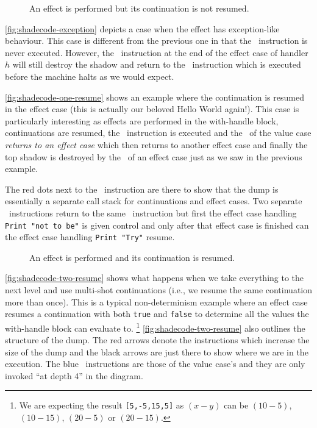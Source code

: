 \documentclass[class=article, crop=false]{standalone}
\begin{document}
\begin{figure}
    \centering
    \caption{An effect is performed but its continuation is not resumed.}
    \label{fig:shadecode-exception}
\end{figure}

\autoref{fig:shadecode-exception} depicts a case when the effect has
exception-like behaviour. This case is different from the previous one in that
the \vmKillShadow\ instruction is never executed. However, the \vmRett\
instruction at the end of the effect case of handler $h$ will still destroy the
shadow and return to the \vmFin\ instruction which is executed before the
machine halts as we would expect.

\autoref{fig:shadecode-one-resume} shows an example where the continuation is
resumed in the effect case (this is actually our beloved Hello World again!).
This case is particularly interesting as effects are performed in the
with-handle block, continuations are resumed, the \vmKillShadow\ instruction is
executed and the \vmRett\ of the value case \emph{returns to an effect case}
which then returns to another effect case and finally the top shadow is
destroyed by the \vmRett\ of an effect case just as we saw in the previous
example.

The red dots next to the \vmApply\ instruction are there to show that the dump
is essentially a separate call stack for continuations and effect cases.
Two separate \vmRett\ instructions return to the same \vmApply\ instruction
but first the effect case handling \lstinline{Print "not to be"} is given
control and only after that effect case is finished can the effect case handling
\lstinline{Print "Try"} resume.

\begin{figure}
    \centering
    \caption{An effect is performed and its continuation is resumed.}
    \label{fig:shadecode-one-resume}
\end{figure}
 
\autoref{fig:shadecode-two-resume} shows what happens when we take everything to
the next level and use multi-shot continuations (i.e., we resume the same
continuation more than once). This is a typical non-determinism example where
an effect case resumes a continuation with both \lstinline{true} and
\lstinline{false} to determine all the values the with-handle block can evaluate
to. \footnote{We are expecting the result \lstinline{[5,-5,15,5]} as $(x-y)$
can be $(10-5)$, $(10-15)$, $(20-5)$ or $(20-15)$.}
\autoref{fig:shadecode-two-resume} also outlines the structure of the dump.
The red arrows denote the instructions which increase the size of the dump and
the black arrows are just there to show where we are in the execution.
The blue \vmRett\ instructions are those of the value case's and they are only
invoked ``at depth 4'' in the diagram.
\end{document}
